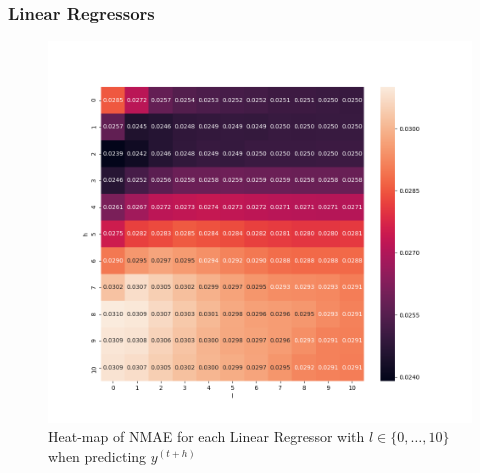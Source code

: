 \documentclass[aspectratio=169]{beamer}
\begin{document}
\begin{frame}
    \frametitle{Linear Regressors}
    \begin{figure}[h!]
        \centering
        \includegraphics[width=\textwidth,height=0.75\textheight,keepaspectratio]{../result/project2/nmae_heatmap.png}
        \caption{Heat-map of \textsc{NMAE} for each Linear Regressor with $l\in\{0,\ldots,10\}$ when predicting $y^{(t+h)}$}
    \end{figure}
\end{frame}
\end{document}
